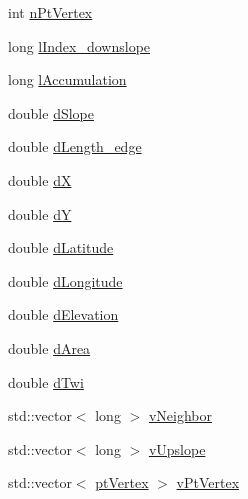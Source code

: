 \begin{DoxyCompactItemize}
\item 
int \hyperlink{classhexwatershed_1_1hexagon_a93823a34e246b721ef643a4d51d2c3ec}{n\-Pt\-Vertex}
\item 
long \hyperlink{classhexwatershed_1_1hexagon_a9c354cb14eb84b007451b3327b38dda6}{l\-Index\-\_\-downslope}
\item 
long \hyperlink{classhexwatershed_1_1hexagon_a15c1c1e3375533e129de46f3bf65d20b}{l\-Accumulation}
\item 
double \hyperlink{classhexwatershed_1_1hexagon_a285d7d5ce99a6911ceb3b76650537a65}{d\-Slope}
\item 
double \hyperlink{classhexwatershed_1_1hexagon_a6c8576044a8bd4426ed43068c95f9a04}{d\-Length\-\_\-edge}
\item 
double \hyperlink{classhexwatershed_1_1hexagon_a648215d55422fe9a9362f6d27a00b54a}{d\-X}
\item 
double \hyperlink{classhexwatershed_1_1hexagon_a245ad005c89847103950b27154e59f51}{d\-Y}
\item 
double \hyperlink{classhexwatershed_1_1hexagon_a9ff55ba110be874b3271620edaad9689}{d\-Latitude}
\item 
double \hyperlink{classhexwatershed_1_1hexagon_ad788beb221f73209c2d37e64892f593a}{d\-Longitude}
\item 
double \hyperlink{classhexwatershed_1_1hexagon_a12551636aad3ba5fb80afbc6a0f9b53b}{d\-Elevation}
\item 
double \hyperlink{classhexwatershed_1_1hexagon_a545b64cdb415e65910a9b4aa722769f3}{d\-Area}
\item 
double \hyperlink{classhexwatershed_1_1hexagon_a5818aa2ad22685002e9f232280fe984e}{d\-Twi}
\item 
std\-::vector$<$ long $>$ \hyperlink{classhexwatershed_1_1hexagon_aed524e274a6b17551e0af17a0e567be3}{v\-Neighbor}
\item 
std\-::vector$<$ long $>$ \hyperlink{classhexwatershed_1_1hexagon_a71e1777d004ed62b1680a84d39b42287}{v\-Upslope}
\item 
std\-::vector$<$ \hyperlink{structhexwatershed_1_1ptVertex}{pt\-Vertex} $>$ \hyperlink{classhexwatershed_1_1hexagon_ab68cf5357b69868ffdb4ff9dec64f441}{v\-Pt\-Vertex}
\end{DoxyCompactItemize}


